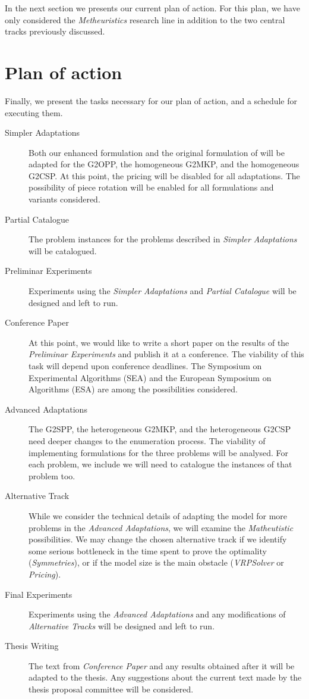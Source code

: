 In the next section we presents our current plan of action.
For this plan, we have only considered the \emph{Metheuristics} research line in addition to the two central tracks previously discussed.

\section{Plan of action}

Finally, we present the tasks necessary for our plan of action, and a schedule for executing them.

\begin{description}
\item[Simpler Adaptations] Both our enhanced formulation and the original formulation of \citet{furini:2016} will be adapted for the G2OPP, the homogeneous G2MKP, and the homogeneous G2CSP. At this point, the pricing will be disabled for all adaptations. The possibility of piece rotation will be enabled for all formulations and variants considered.
\item[Partial Catalogue] The problem instances for the problems described in \emph{Simpler Adaptations} will be catalogued.
\item[Preliminar Experiments] Experiments using the \emph{Simpler Adaptations} and \emph{Partial Catalogue} will be designed and left to run.
\item[Conference Paper] At this point, we would like to write a short paper on the results of the \emph{Preliminar Experiments} and publish it at a conference. The viability of this task will depend upon conference deadlines. The Symposium on Experimental Algorithms (SEA) and the European Symposium on Algorithms (ESA) are among the possibilities considered.
\item[Advanced Adaptations] The G2SPP, the heterogeneous G2MKP, and the heterogeneous G2CSP need deeper changes to the enumeration process. The viability of implementing formulations for the three problems will be analysed. For each problem, we include we will need to catalogue the instances of that problem too.
\item[Alternative Track] While we consider the technical details of adapting the model for more problems in the \emph{Advanced Adaptations}, we will examine the \emph{Matheutistic} possibilities. We may change the chosen alternative track if we identify some serious bottleneck in the time spent to prove the optimality (\emph{Symmetries}), or if the model size is the main obstacle (\emph{VRPSolver} or \emph{Pricing}).
\item[Final Experiments] Experiments using the \emph{Advanced Adaptations} and any modifications of \emph{Alternative Tracks} will be designed and left to run.
\item[Thesis Writing] The text from \emph{Conference Paper} and any results obtained after it will be adapted to the thesis. Any suggestions about the current text made by the thesis proposal committee will be considered.
\end{description}

